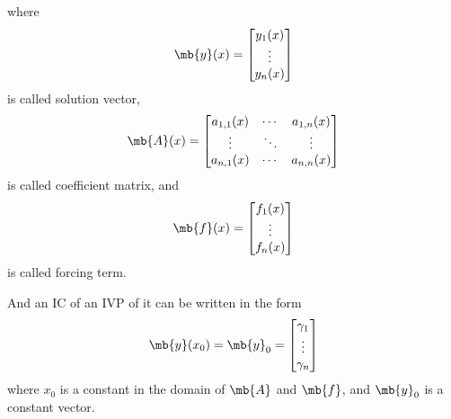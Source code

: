\documentclass[a4paper,12pt]{report}
\begin{document}
where
\[\mb{y}(x)=\begin{bmatrix}y_1(x)\\\vdots\\y_n(x)\end{bmatrix}\]
is called solution vector,
\[\mb{A}(x)=\begin{bmatrix}a_{1,1}(x) & \cdots & a_{1,n}(x)\\\vdots & \ddots & \vdots\\a_{n,1}(x) & \cdots & a_{n,n}(x)\end{bmatrix}\]
is called coefficient matrix, and
\[\mb{f}(x)=\begin{bmatrix}f_1(x)\\\vdots\\f_n(x)\end{bmatrix}\]
is called forcing term.

And an IC of an IVP of it can be written in the form
\[\mb{y}(x_0)=\mb{y}_0=\begin{bmatrix}\gamma_1\\\vdots\\\gamma_n\end{bmatrix}\]
where $x_0$ is a constant in the domain of $\mb{A}$ and $\mb{f}$, and $\mb{y}_0$ is a constant vector.
\end{document}
